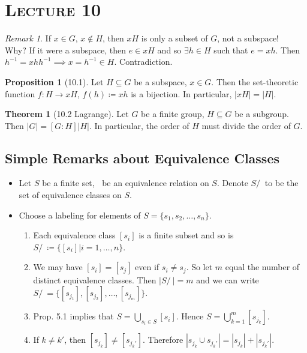 \documentclass{article}
\newcommand{\union}{\cup}
\newcommand{\Union}{\bigcup}
\newcommand{\coleq}{\coloneqq}
\newcommand{\inverse}[1]{#1^{-1}}
\newcommand{\func}[3]{#1: #2 \to #3}
\theoremstyle{definition}
\newtheorem*{thm}{Theorem}
\newtheorem*{prop}{Proposition}
\theoremstyle{remark}
\newtheorem*{rmk}{Remark}
\begin{document}
    
    \noindent\section*{\textbf{\textsc{Lecture 10}}}{
        \begin{rmk}
            If $x\in G$, $x\notin H$, then $xH$ is only a subset of $G$, not a subspace!\\
            Why? If it were a subspace, then $e \in xH$ and so $\exists h \in H$ such that $e=xh$. Then $\inverse{h}=xh\inverse{h} \implies x=\inverse{h}\in H$. Contradiction.
        \end{rmk}
        
        \begin{prop}[10.1]
            Let $H \subseteq G$ be a subspace, $x \in G$. Then the set-theoretic function $\func{f}{H}{xH}$, $f(h) \coleq xh$ is a bijection. In particular, $|xH|=|H|$.
        \end{prop}
        
        \begin{thm}[10.2 Lagrange]
            Let $G$ be a finite group, $H \subseteq G$ be a subgroup. Then $|G|=[G:H]|H|$. In particular, the order of $H$ must divide the order of $G$. 
        \end{thm}
        
        \subsection*{Simple Remarks about Equivalence Classes}{
            \begin{itemize}
                \item Let $S$ be a finite set, $~$ be an equivalence relation on $S$. Denote $S/~$ to be the set of equivalence classes on $S$.
                \item Choose a labeling for elements of $S=\{s_1,s_2,\ldots,s_n\}$.
                \begin{enumerate}
                    \item Each equivalence class $[s_i]$ is a finite subset and so is $S/~\coleq\{[s_i]|i=1,\ldots,n\}$.
                    \item We may have $[s_i]=[s_j]$ even if $s_i\neq s_j$. So let $m$ equal the number of distinct equivalence classes. Then $|S/~|=m$ and we can write $S/~=\{[s_{j_1}],[s_{j_2}],\ldots,[s_{j_m}]\}$.
                    \item Prop. 5.1 implies that $S=\Union_{s_i \in S}[s_i]$. Hence $S=\Union_{k=1}^m [s_{j_k}]$.
                    \item If $k\neq k'$, then $[s_{j_k}] \neq [s_{j_k'}]$. Therefore $|s_{j_k} \union s_{j_k'}|=|s_{j_k}|+|s_{j_k'}|$.
                \end{enumerate}
            \end{itemize}
            
}}
\end{document}
